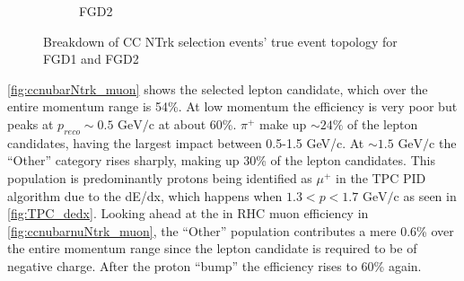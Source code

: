 \begin{figure}[h]
\begin{subfigure}[t]{0.49\textwidth}
		\caption{FGD2}
	\end{subfigure}
	\caption{Breakdown of \numubar CC NTrk selection events' true event topology for FGD1 and FGD2 }
	\label{fig:ccnubarNtrk_topology}
\end{figure}

\autoref{fig:ccnubarNtrk_muon} shows the selected lepton candidate, which over the entire momentum range is 54\%. At low momentum the efficiency is very poor but peaks at $p_{reco} \sim 0.5 \text{ GeV/c}$ at about 60\%. $\pi^+$ make up $\sim24\%$ of the lepton candidates, having the largest impact between 0.5-1.5 GeV/c. At $\sim 1.5\text{ GeV/c}$ the ``Other'' category rises sharply, making up 30\% of the lepton candidates. This population is predominantly protons being identified as $\mu^+$ in the TPC PID algorithm due to the dE/dx, which happens when $1.3 < p < 1.7 \text{ GeV/c}$ as seen in \autoref{fig:TPC_dedx}. Looking ahead at the \numu in RHC muon efficiency in \autoref{fig:ccnubarnuNtrk_muon}, the ``Other'' population contributes a mere 0.6\% over the entire momentum range since the lepton candidate is required to be of negative charge. After the proton ``bump'' the efficiency rises to 60\% again.
